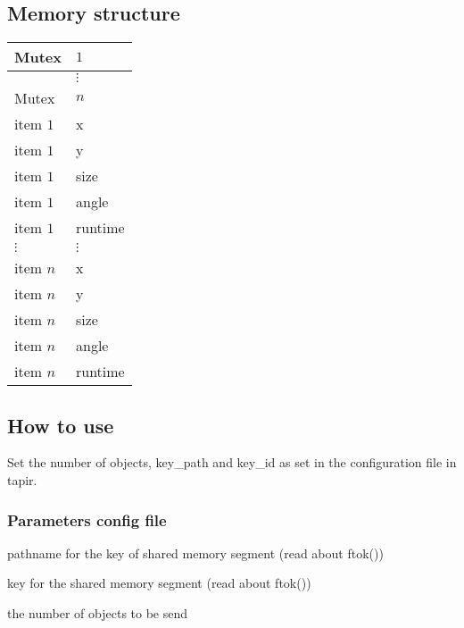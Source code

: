 \subsection{Memory structure}
\begin{center}
\begin{tabular}{l|l}
    Mutex    & $1$ \\ \hline
             & $\vdots$ \\ \hline  
    Mutex    & $n$ \\ \hline
    item $1$ & x \\ \hline
    item $1$ & y \\ \hline
    item $1$ & size \\ \hline 
    item $1$ & angle \\ \hline
    item $1$ & runtime \\ \hline
    $\vdots$ & $\vdots$ \\ \hline
    item $n$ & x \\ \hline
    item $n$ & y \\ \hline
    item $n$ & size \\ \hline 
    item $n$ & angle \\ \hline
    item $n$ & runtime
\end{tabular}
\end{center}

\subsection{How to use}

Set the number of objects, key\_path and key\_id as set in the 
configuration file in tapir.

\subsubsection{Parameters config file}

    \begin{description} \itemindent=-15pt
        \item[key\_path] pathname for the key of shared memory segment 
                (read about ftok())
        \item[key\_id] key for the shared memory segment (read about ftok())
        \item[nb\_objects] the number of objects to be send
    \end{description}
